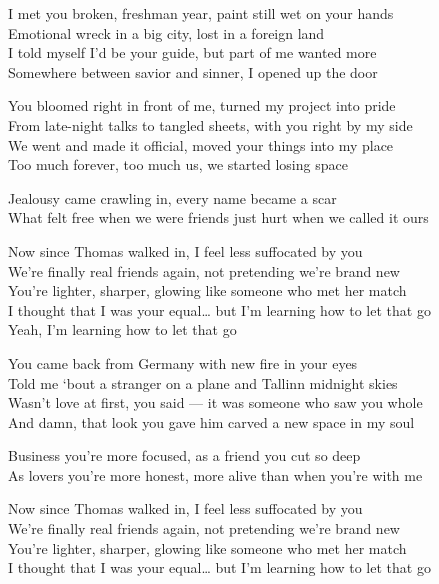 \begin{lyrics}

I met you broken, freshman year, paint still wet on your hands\\
Emotional wreck in a big city, lost in a foreign land\\
I told myself I’d be your guide, but part of me wanted more\\
Somewhere between savior and sinner, I opened up the door

You bloomed right in front of me, turned my project into pride\\
From late-night talks to tangled sheets, with you right by my side\\
We went and made it official, moved your things into my place\\
Too much forever, too much us, we started losing space

Jealousy came crawling in, every name became a scar\\
What felt free when we were friends just hurt when we called it ours

Now since Thomas walked in, I feel less suffocated by you\\
We’re finally real friends again, not pretending we’re brand new\\
You’re lighter, sharper, glowing like someone who met her match\\
I thought that I was your equal… but I’m learning how to let that go\\
Yeah, I’m learning how to let that go

You came back from Germany with new fire in your eyes\\
Told me ‘bout a stranger on a plane and Tallinn midnight skies\\
Wasn’t love at first, you said — it was someone who saw you whole\\
And damn, that look you gave him carved a new space in my soul

Business you’re more focused, as a friend you cut so deep\\
As lovers you’re more honest, more alive than when you’re with me

Now since Thomas walked in, I feel less suffocated by you\\
We’re finally real friends again, not pretending we’re brand new\\
You’re lighter, sharper, glowing like someone who met her match\\
I thought that I was your equal… but I’m learning how to let that go


\end{lyrics}

